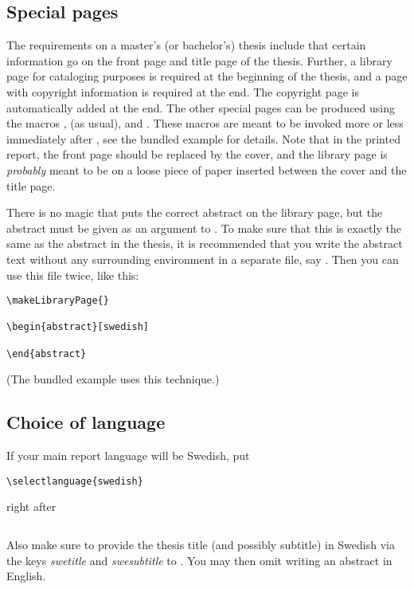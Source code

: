 \subsection{Special pages}
%
The requirements on a master's (or bachelor's) thesis include that certain information go on the front page and title page of the thesis.  Further, a library page for cataloging purposes is required at the beginning of the thesis, and a page with copyright information is required at the end.  The copyright page is automatically added at the end.  The other special pages can be produced using the macros ,  (as usual), and .  These macros are meant to be invoked more or less immediately after , see the bundled example for details.  Note that in the printed report, the front page should be replaced by the cover, and the library page is \emph{probably} meant to be on a loose piece of paper inserted between the cover and the title page.

There is no magic that puts the correct abstract on the library page, but the abstract must be given as an argument to .  To make sure that this is exactly the same as the abstract in the thesis, it is recommended that you write the abstract text without any surrounding  environment in a separate file, say .  Then you can use this file twice, like this:
{\verbatimsize
\begin{verbatim}
\makeLibraryPage{}

\begin{abstract}[swedish]
  
\end{abstract}
\end{verbatim}}
(The bundled example uses this technique.)

\subsection{Choice of language}
%
If your main report language will be Swedish, put
{\verbatimsize
\begin{verbatim}
\selectlanguage{swedish}
\end{verbatim}}
right after
{\verbatimsize
\begin{verbatim}

\end{verbatim}}
Also make sure to provide the thesis title (and possibly subtitle) in Swedish via the keys \emph{swetitle} and \emph{swesubtitle} to .  You may then omit writing an abstract in English.

